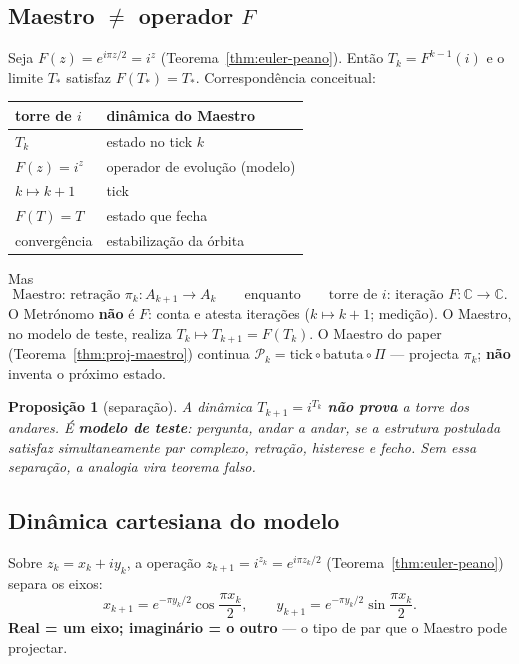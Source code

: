 \documentclass[11pt,a4paper]{article}
\newtheorem{proposicao}{Proposição}
\begin{document}
\subsection*{Maestro $\neq$ operador $F$}

Seja $F(z)=e^{i\pi z/2}=i^{z}$ (Teorema~\ref{thm:euler-peano}).
Então $T_k=F^{k-1}(i)$ e o limite
$T_{\ast}$ satisfaz $F(T_{\ast})=T_{\ast}$. Correspondência conceitual:
\begin{center}\small
\begin{tabular}{@{}ll@{}}
\toprule
torre de $i$ & dinâmica do Maestro \\
\midrule
$T_k$ & estado no tick $k$ \\
$F(z)=i^{z}$ & operador de evolução (modelo) \\
$k\mapsto k+1$ & tick \\
$F(T)=T$ & estado que fecha \\
convergência & estabilização da órbita \\
\bottomrule
\end{tabular}
\end{center}
Mas
\[
\boxed{\text{Maestro: retração }\pi_k\colon A_{k+1}\to A_k}
\qquad\text{enquanto}\qquad
\boxed{\text{torre de }i\text{: iteração }F\colon\mathbb{C}\to\mathbb{C}}.
\]
O Metrónomo \textbf{não} é $F$: conta e atesta iterações
($k\mapsto k+1$; medição). O Maestro, no modelo de teste, realiza
$T_k\mapsto T_{k+1}=F(T_k)$. O Maestro do paper
(Teorema~\ref{thm:proj-maestro}) continua
$\mathcal{P}_k=\mathrm{tick}\circ\mathrm{batuta}\circ\Pi$ --- projecta
$\pi_k$; \textbf{não} inventa o próximo estado.

\begin{proposicao}[separação]\label{prop:analogia-i}
A dinâmica $T_{k+1}=i^{T_k}$ \textbf{não prova} a torre dos andares.
É \textbf{modelo de teste}: pergunta, andar a andar, se a estrutura
postulada satisfaz simultaneamente par complexo, retração, histerese e
fecho. Sem essa separação, a analogia vira teorema falso.
\end{proposicao}

\subsection*{Dinâmica cartesiana do modelo}

Sobre $z_k=x_k+iy_k$, a operação $z_{k+1}=i^{z_k}=e^{i\pi z_k/2}$
(Teorema~\ref{thm:euler-peano}) separa os eixos:
\[
\boxed{
x_{k+1}=e^{-\pi y_k/2}\cos\frac{\pi x_k}{2},
\qquad
y_{k+1}=e^{-\pi y_k/2}\sin\frac{\pi x_k}{2}.
}
\]
\textbf{Real = um eixo; imaginário = o outro} --- o tipo de par que o
Maestro pode projectar.
\end{document}
